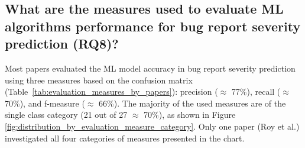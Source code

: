 \subsection{What are the measures used to evaluate ML algorithms performance for bug report severity prediction (RQ8)?}\label{subsec:rq8_result}

Most papers evaluated the ML model accuracy in bug report severity prediction using three measures based on the confusion matrix (Table~\ref{tab:evaluation_measures_by_papers}): precision ($\approx$ 77\%), recall ($\approx$ 70\%), and f-measure ($\approx$ 66\%). The majority of the used measures are of the single class category (21 out of 27 $\approx$ 70\%), as shown in Figure \ref{fig:distribution_by_evaluation_measure_category}. Only one paper (Roy et al.\cite{Roy:2014}) investigated all four categories of measures presented in the chart.

